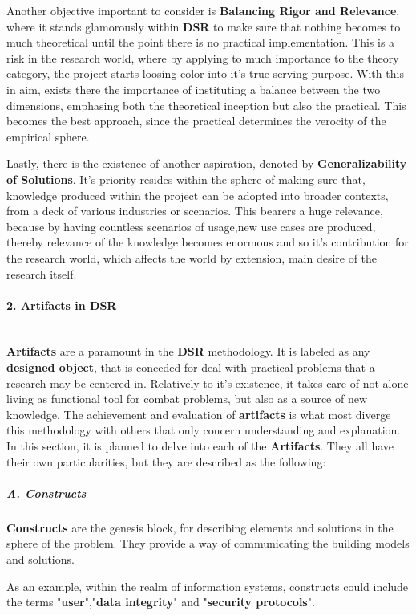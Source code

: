 Another objective important to consider is \textbf{Balancing Rigor and Relevance}, where it stands glamorously within \textbf{DSR} to make sure that nothing becomes to much theoretical until the point there is no practical implementation. This is a risk in the research world, where by applying to much importance to the theory category, the project starts loosing color into it's true serving purpose. With this in aim, exists there the importance of instituting a balance between the two dimensions, emphasing both the theoretical inception but also the practical. This becomes the best approach, since the practical determines the verocity of the empirical sphere.

Lastly, there is the existence of another aspiration, denoted by \textbf{Generalizability of Solutions}. It's priority resides within the sphere of making sure that, knowledge produced within the project can be adopted into broader contexts, from a deck of various industries or scenarios. This bearers a huge relevance, because by having countless scenarios of usage,new use cases are produced, thereby relevance of the knowledge becomes enormous and so it's contribution for the research world, which affects the world by extension, main desire of the research itself.

\paragraph{2. Artifacts in DSR}\mbox{}\\
\textbf{Artifacts} are a paramount in the \textbf{DSR} methodology. It is labeled as any \textbf{designed object}, that is conceded for deal with practical problems that a research may be centered in. Relatively to it's existence, it takes care of not alone living as functional tool for combat problems, but also as a source of new knowledge. The achievement and evaluation of \textbf{artifacts} is what most diverge this methodology with others that only concern understanding and explanation.
In this section, it is planned to delve into each of the \textbf{Artifacts}. They all have their own particularities, but they are described as the following:

\subparagraph{A. Constructs}\mbox{}

\textbf{Constructs} are the genesis block, for describing elements and solutions in the sphere of the problem. They provide a way of communicating the building models and solutions.

As an example, within the realm of information systems, constructs could include the terms "\textbf{user}","\textbf{data integrity}" and "\textbf{security protocols}".

